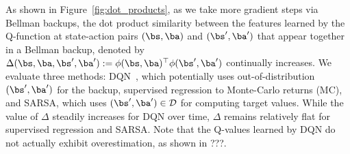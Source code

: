 As shown in Figure~\ref{fig:dot_products}, as we take more gradient steps via Bellman backups, the dot product similarity between the features learned by the Q-function at 
state-action pairs $(\bs, \ba)$ and $(\bs', \ba')$ that appear together in a Bellman backup, denoted by $\Delta(\bs, \ba, \bs', \ba') := \phi(\bs, \ba)^\top \phi(\bs', \ba')$
continually increases. We evaluate three methods: DQN~\citep{Mnih2015}, which potentially uses out-of-distribution $(\bs', \ba')$ for the backup, supervised regression to Monte-Carlo returns (MC), and SARSA, which uses $(\bs', \ba') \in \mathcal{D}$ for computing target values. While the value of $\Delta$ steadily increases for DQN over time, $\Delta$ remains relatively flat for supervised regression and SARSA. Note that the Q-values learned by DQN do not actually exhibit overestimation, as shown in ???.

